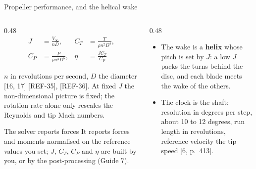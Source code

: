 \begin{frame}[shrink=5]{Propeller performance, and the helical wake}
\begin{columns}[T]
\begin{column}{0.48\textwidth}
\begin{align*}
J &= \frac{V_\infty}{nD}, & C_T &= \frac{T}{\rho n^2 D^4}, \\
C_P &= \frac{P}{\rho n^3 D^5}, & \eta &= \frac{J C_T}{C_P}
\end{align*}
{\small \(n\) in revolutions per second, \(D\) the diameter [16, 17] [REF-35], [REF-36]. At
fixed \(J\) the non-dimensional picture is fixed; the rotation rate alone only
rescales the Reynolds and tip Mach numbers.\par}
\vspace{1mm}
\begin{alertblock}{The solver reports forces}
\small It reports forces and moments normalised on the reference values you
set; \(J\), \(C_T\), \(C_P\) and \(\eta\) are built by you, or by the
post-processing (Guide 7).
\end{alertblock}
\end{column}
\begin{column}{0.48\textwidth}
\begin{itemize}\small
  \item The wake is a \textbf{helix} whose pitch is set by \(J\): a low \(J\)
        packs the turns behind the disc, and each blade meets the wake of the
        others.
  \item The clock is the shaft: resolution in degrees per step, about 10 to 12
        degrees, run length in revolutions, reference velocity the tip speed
        [6, p.~413].
\end{itemize}
\end{column}
\end{columns}
\end{frame}
